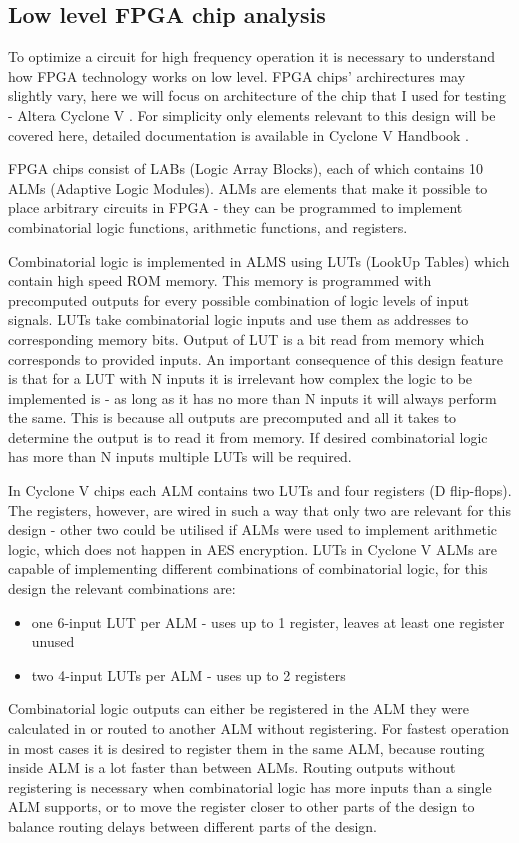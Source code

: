 \subsection{Low level FPGA chip analysis}
\label{sec:low-level-fpga}
To optimize a circuit for high frequency operation it is necessary to understand how FPGA technology works on low level. FPGA chips' archirectures may slightly vary, here we will focus on architecture of the chip that I used for testing - Altera Cyclone V \cite[Chapter 1]{altera-vol1}. For simplicity only elements relevant to this design will be covered here, detailed documentation is available in Cyclone V Handbook \cite{altera-vol1}.

FPGA chips consist of LABs (Logic Array Blocks), each of which contains 10 ALMs (Adaptive Logic Modules). ALMs are elements that make it possible to place arbitrary circuits in FPGA - they can be programmed to implement combinatorial logic functions, arithmetic functions, and registers.

Combinatorial logic is implemented in ALMS using LUTs (LookUp Tables) which contain high speed ROM memory. This memory is programmed with precomputed outputs for every possible combination of logic levels of input signals. LUTs take combinatorial logic inputs and use them as addresses to corresponding memory bits. Output of LUT is a bit read from memory which corresponds to provided inputs. An important consequence of this design feature is that for a LUT with N inputs it is irrelevant how complex the logic to be implemented is - as long as it has no more than N inputs it will always perform the same. This is because all outputs are precomputed and all it takes to determine the output is to read it from memory. If desired combinatorial logic has more than N inputs multiple LUTs will be required.

In Cyclone V chips each ALM contains two LUTs and four registers (D flip-flops). The registers, however, are wired in such a way that only two are relevant for this design - other two could be utilised if ALMs were used to implement arithmetic logic, which does not happen in AES encryption. LUTs in Cyclone V ALMs are capable of implementing different combinations of combinatorial logic, for this design the relevant combinations are:
\begin{itemize}
\item one 6-input LUT per ALM - uses up to 1 register, leaves at least one register unused
\item two 4-input LUTs per ALM - uses up to 2 registers
\end{itemize}
Combinatorial logic outputs can either be registered in the ALM they were calculated in or routed to another ALM without registering. For fastest operation in most cases it is desired to register them in the same ALM, because routing inside ALM is a lot faster than between ALMs. Routing outputs without registering is necessary when combinatorial logic has more inputs than a single ALM supports, or to move the register closer to other parts of the design to balance routing delays between different parts of the design.

